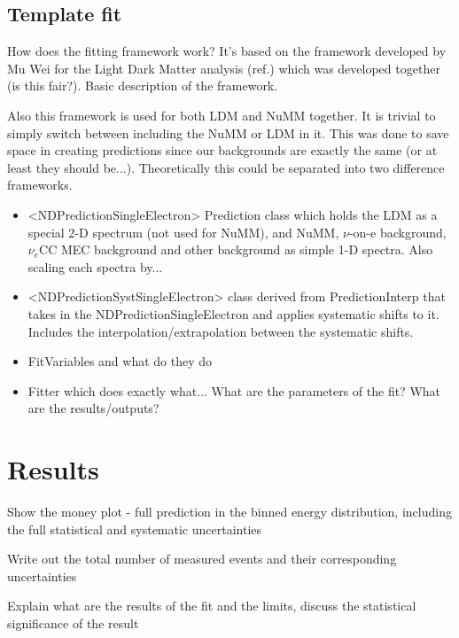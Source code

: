 \subsection{Template fit}
How does the fitting framework work? It's based on the framework developed by Mu Wei for the Light Dark Matter analysis (ref.) which was developed together (is this fair?). Basic description of the framework.

Also this framework is used for both LDM and NuMM together. It is trivial to simply switch between including the NuMM or LDM in it. This was done to save space in creating predictions since our backgrounds are exactly the same (or at least they should be...). Theoretically this could be separated into two difference frameworks.

\begin{itemize}
\item <NDPredictionSingleElectron> Prediction class which holds the LDM as a special 2-D spectrum (not used for NuMM), and NuMM, $\nu$-on-e background, $\nu_e$CC MEC background and other background as simple 1-D spectra. Also scaling each spectra by...
\item <NDPredictionSystSingleElectron> class derived from PredictionInterp that takes in the NDPredictionSingleElectron and applies systematic shifts to it. Includes the interpolation/extrapolation between the systematic shifts.
\item FitVariables and what do they do
\item Fitter which does exactly what... What are the parameters of the fit? What are the results/outputs?
\end{itemize}
\fi


\section{Results}\label{sec:NuMMResults}

Show the money plot - full prediction in the binned energy distribution, including the full statistical and systematic uncertainties

Write out the total number of measured events and their corresponding uncertainties

Explain what are the results of the fit and the limits, discuss the statistical significance of the result

